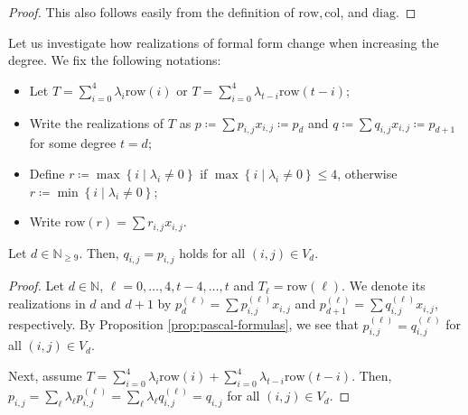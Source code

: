   \begin{proof}
    This also follows easily from the definition of $\mathrm{row}, \mathrm{col}$, and \(\mathrm{diag} \). 
  \end{proof}
  
  Let us investigate how realizations of formal form change when increasing the degree. We fix the following notations:
\begin{itemize}
    \item Let \( T = \sum_{i=0}^{4}  \lambda_{i} \mathrm{row}(i)  \) or \( T = \sum_{i=0}^{4}  \lambda_{t-i} \mathrm{row}(t-i) \);
    \item Write the realizations of \( T \) as \( p \coloneqq \sum p_{i,j}x_{i,j}  \coloneqq p_d  \) and \( q \coloneqq \sum q_{i,j}x_{i,j} \coloneqq p_{d+1} \) for some degree \( t = d \);
    \item Define \( r \coloneqq \max\left\{ i \mid \lambda_i \neq 0 \right\} \) if \(  \max\left\{ i \mid \lambda_i \neq 0 \right\} \leq 4 \), otherwise \( r \coloneqq \min\left\{ i \mid \lambda_i \neq 0 \right\} \); 
    \item Write \( \mathrm{row}(r) = \sum r_{i,j}x_{i,j} \).
\end{itemize}  


\begin{lemma}\label{prop:row_extend_d}
    Let \( d \in \mathbb{N}_{\geq 9} \). Then, \( q_{i,j} = p_{i,j} \) holds for all \( (i,j) \in V_d \).
\end{lemma}
  
\begin{proof}
    Let \( d \in \mathbb{N} \), \( \ell = 0, \dots, 4,t-4,\dots,t \) and \(T_{\ell} =  \mathrm{row}(\ell) \). We denote its realizations in \( d \) and \( d + 1 \) by \( p_d^{(\ell)} = \sum p_{i,j}^{(\ell)}x_{i,j} \) and \( p_{d+1}^{(\ell)} = \sum q_{i,j}^{(\ell)}x_{i,j} \), respectively. By Proposition \ref{prop:pascal-formulas}, we see that \( p_{i,j}^{(\ell)} = q_{i,j}^{(\ell)} \) for all \( (i,j) \in V_d \).
    
    Next, assume \( T =  \sum_{i=0}^{4}  \lambda_{i} \mathrm{row}(i) + \sum_{i=0}^{4}  \lambda_{t-i} \mathrm{row}(t-i)  \). Then, \( p_{i,j} = \sum_{\ell} \lambda_\ell p_{i,j}^{(\ell)} = \sum_{\ell} \lambda_\ell q_{i,j}^{(\ell)} = q_{i,j} \) for all \( (i,j) \in V_d \).
\end{proof}
  
